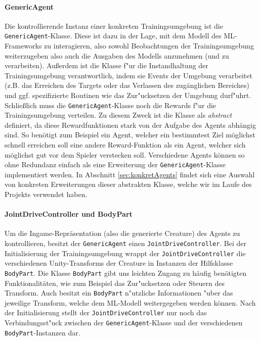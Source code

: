 \paragraph{GenericAgent}

Die kontrollierende Instanz einer konkreten Trainingsumgebung ist die \texttt{GenericAgent}-Klasse. Diese ist dazu in der Lage, mit dem Modell des ML-Frameworks zu interagieren, also sowohl Beobachtungen der Trainingsumgebung weiterzugeben also auch die Ausgaben des Modells anzunehmen (und zu verarbeiten). Außerdem ist die Klasse f"ur die Instandhaltung der Trainingsumgebung verantwortlich, indem sie Events der Umgebung verarbeitet (z.B. das Erreichen des Targets oder das Verlassen des zugänglichen Bereiches) und ggf. spezifizierte Routinen wie das Zur"ucksetzen der Umgebung durf"uhrt.
Schließlich muss die \texttt{GenericAgent}-Klasse noch die Rewards f"ur die Trainingsumgebung verteilen. Zu diesem Zweck ist die Klasse als \textit{abstract} definiert, da diese Rewardfunktionen stark von der Aufgabe des Agents abhängig sind. So benötigt zum Beispiel ein Agent, welcher ein bestimmtest Ziel möglichst schnell erreichen soll eine andere Reward-Funktion als ein Agent, welcher sich möglichst gut vor dem Spieler verstecken soll. Verschiedene Agents können so ohne Redundanz einfach als eine Erweiterung der \texttt{GenericAgent}-Klasse implementiert werden. In Abschnitt \ref{sec:konkretAgents} findet sich eine Auswahl von konkreten Erweiterungen dieser abstrakten Klasse, welche wir im Laufe des Projekts verwendet haben.

\paragraph{JointDriveController und BodyPart}

Um die Ingame-Repräsentation (also die generierte Creature) des Agents zu kontrollieren, besitzt der \texttt{GenericAgent} einen \texttt{JointDriveController}. Bei der Initialisierung der Trainingsumgebung wrappt der \texttt{JointDriveController} die verschiedenen Unity-Transforms der Creature in Instanzen der Hilfsklasse \texttt{BodyPart}. Die Klasse \texttt{BodyPart} gibt uns leichten Zugang zu häufig benötigten Funktionalitäten, wie zum Beispiel das Zur"ucksetzen oder Steuern des Transform. Auch besitzt ein \texttt{BodyPart} n"utzliche Informationen "uber das jeweilige Transform, welche dem ML-Modell weitergegeben werden können. Nach der Initialisierung stellt der \texttt{JointDriveController} nur noch das Verbindungsst"uck zwischen der \texttt{GenericAgent}-Klasse und der verschiedenen \texttt{BodyPart}-Instanzen dar. 


